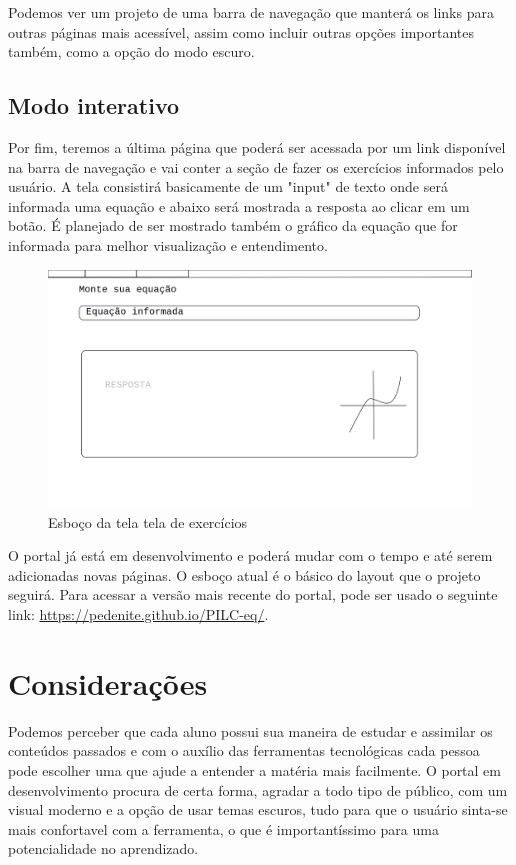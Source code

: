 \documentclass[12pt]{report}
\begin{document}
Podemos ver um projeto de uma barra de navegação que manterá os links para outras páginas mais acessível, assim como incluir outras opções importantes também, como a opção do modo escuro.

\section{Modo interativo}
Por fim, teremos a última página que poderá ser acessada por um link disponível na barra de navegação e vai conter a seção de fazer os exercícios informados pelo usuário. A tela consistirá basicamente de um "input" de texto onde será informada uma equação e abaixo será mostrada a resposta ao clicar em um botão. É planejado de ser mostrado também o gráfico da equação que for informada para melhor visualização e entendimento.

\begin{figure}[H]
    \includegraphics[width=1\textwidth]{img/d.png}
    \caption{Esboço da tela tela de exercícios}
\end{figure}

O portal já está em desenvolvimento e poderá mudar com o tempo e até serem adicionadas novas páginas. O esboço atual é o básico do layout que o projeto seguirá. Para acessar a versão mais recente do portal, pode ser usado o seguinte link: \url{https://pedenite.github.io/PILC-eq/}.

\chapter{Considerações}
Podemos perceber que cada aluno possui sua maneira de estudar e assimilar os conteúdos passados e com o auxílio das ferramentas tecnológicas cada pessoa pode escolher uma que ajude a entender a matéria mais facilmente. O portal em desenvolvimento procura de certa forma, agradar a todo tipo de público, com um visual moderno e a opção de usar temas escuros, tudo para que o usuário sinta-se mais confortavel com a ferramenta, o que é importantíssimo para uma potencialidade no aprendizado.
\end{document}
